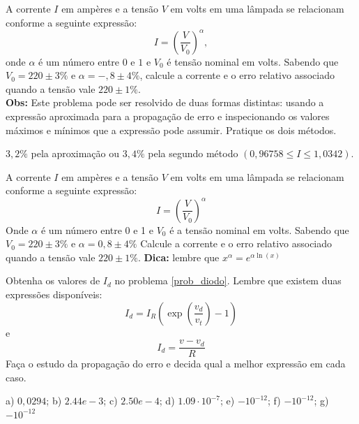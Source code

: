 \documentclass[main.tex]{subfiles}
\begin{document}
\begin{Exercise} A corrente $I$ em ampères e a tensão $V$ em volts em uma lâmpada se relacionam conforme a seguinte expressão:
  \begin{equation*}
    I=\left(\frac{V}{V_0}\right)^\alpha,
  \end{equation*}
onde $\alpha$ é um número entre $0$ e $1$ e $V_0$ é tensão nominal em volts. Sabendo que $V_0=220\pm 3\%$ e $\alpha=-,8\pm 4\%$, calcule a corrente e o erro relativo associado quando a tensão vale $220\pm 1\%$.\\
{\bf Obs:} Este problema pode ser resolvido de duas formas distintas: usando a expressão aproximada para a propagação de erro e inspecionando os valores máximos e mínimos que a expressão pode assumir. Pratique os dois métodos.
\end{Exercise}
\begin{Answer}
  \begin{tiny}
    $3,2\%$ pela aproximação ou $3,4\%$ pela segundo método  $\left(0,96758 \leq I\leq 1,0342\right)$.
  \end{tiny} 
\end{Answer}

\begin{Exercise} A corrente $I$ em ampères e a tensão $V$ em volts em uma lâmpada se relacionam conforme a seguinte expressão:
$$I=\left(\frac{V}{V_0}\right)^\alpha$$
Onde $\alpha$ é um número entre 0 e 1 e $V_0$ é a tensão nominal em volts. Sabendo que $V_0=220\pm 3\%$ e $\alpha=0,8\pm 4\%$
Calcule a corrente e o erro relativo associado quando a tensão vale $220\pm 1\%$.
{\bf Dica:} lembre que $x^\alpha=e^{\alpha \ln(x)}$
\end{Exercise}

\begin{Exercise}[title= Propagação de erros] Obtenha os valores de $I_d$ no problema \ref{prob_diodo}. Lembre que existem duas expressões disponíveis:
  \begin{equation*}
    I_d=I_R\left(\exp\left(\frac{v_d}{v_t}\right)-1\right)  
  \end{equation*}
e
\begin{equation*}
  I_d=\frac{v-v_d}{R}
\end{equation*}
Faça o estudo da propagação do erro e decida qual a melhor expressão em cada caso.
\end{Exercise}
\begin{Answer}
  \begin{tiny}
  a) $0,0294$; b) $2.44e-3$; c) $2.50e-4$; d) $1.09\cdot 10^{-7}$; e) $- 10^{-12}$; f) $-10^{-12}$; g) $- 10^{-12}$  
  \end{tiny}
\end{Answer}
\end{document}
